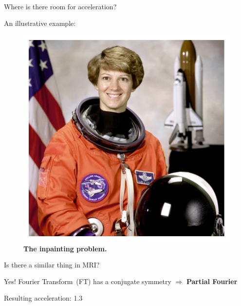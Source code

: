 \begin{frame}{Where is there room for acceleration?}
\begin{overprint}
    \hfill \break
    An illustrative example:
    \begin{figure}
        \centering
        \includegraphics[height=0.4\textheight]{Figures/intro_figures/astronaut.pdf}
        \caption{\label{fig:astronaut}\textbf{The inpainting problem.} 
        }
    \end{figure}
    
        \hfill \break
        Is there a similar thing in MRI?

        Yes! Fourier Transform~(FT) has a conjugate symmetry $\Rightarrow$ \textbf{Partial Fourier}
        
        Resulting acceleration: 1.3
    
    \end{overprint}
    
\end{frame}

